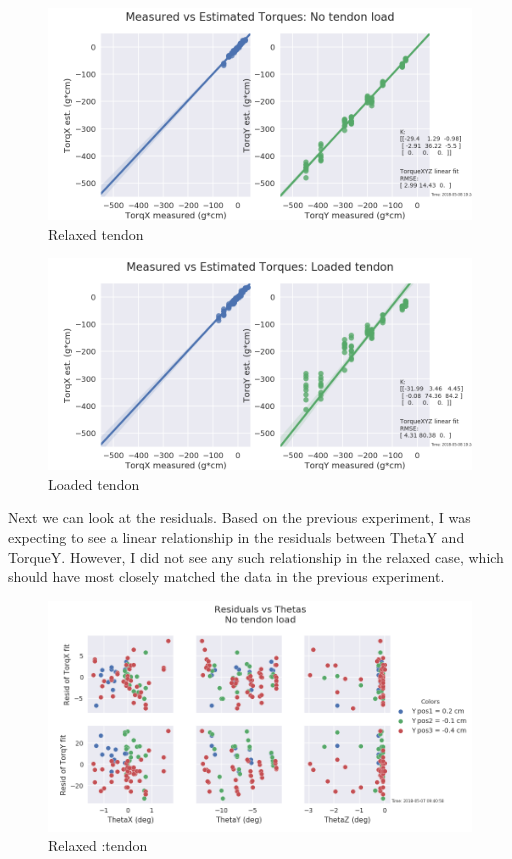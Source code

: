 \documentclass[preprint,12pt,3p]{elsarticle}
\begin{document}
\begin{figure}[H]
\centering
\includegraphics[width=\textwidth]{images/stiff/torqsanity.png}
\caption{Relaxed tendon}
\end{figure}

\begin{figure}[H]
\centering
\includegraphics[width=\textwidth]{images/stiff/torqsanity_loaded.png}
\caption{Loaded tendon}
\end{figure}



Next we can look at the residuals. Based on the previous experiment, I was expecting to see a linear
relationship in the residuals between ThetaY and TorqueY. However, I did not see any such
relationship in the relaxed case, which should have most closely matched the data in the previous
experiment. 

\begin{figure}[H]
\centering
\includegraphics[width=.9\textwidth]{images/stiff/GOODResid_vs_Theta.png}
\caption{Relaxed :tendon}
\end{figure}
\end{document}
